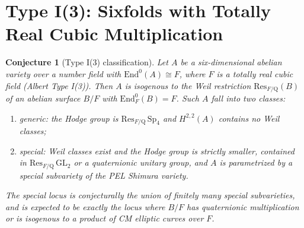 \documentclass{article}
\newcommand{\mathbb}[1]{\mathrm{#1}}
\newtheorem{conjecture}{Conjecture}
\begin{document}
\section{Type I(3): Sixfolds with Totally Real Cubic Multiplication}

\begin{conjecture}[Type I(3) classification]
Let \(A\) be a six-dimensional abelian variety over a number field with
\(\mathrm{End}^0(A) \cong F\), where \(F\) is a totally real cubic field
(Albert Type I(3)). Then \(A\) is isogenous to the Weil restriction
\(\mathrm{Res}_{F/\mathbb{Q}}(B)\) of an abelian surface \(B/F\) with
\(\mathrm{End}^0_F(B) = F\). Such \(A\) fall into two classes:
\begin{enumerate}
  \item \emph{generic}: the Hodge group is \(\mathrm{Res}_{F/\mathbb{Q}}\,\mathrm{Sp}_4\)
        and \(H^{2,2}(A)\) contains no Weil classes;
  \item \emph{special}: Weil classes exist and the Hodge group is strictly smaller,
        contained in \(\mathrm{Res}_{F/\mathbb{Q}}\,\mathrm{GL}_2\) or a quaternionic
        unitary group, and \(A\) is parametrized by a special subvariety of the PEL
        Shimura variety.
\end{enumerate}
The special locus is conjecturally the union of finitely many special subvarieties,
and is expected to be exactly the locus where \(B/F\) has quaternionic multiplication
or is isogenous to a product of CM elliptic curves over \(F\).
\end{conjecture}
\end{document}
